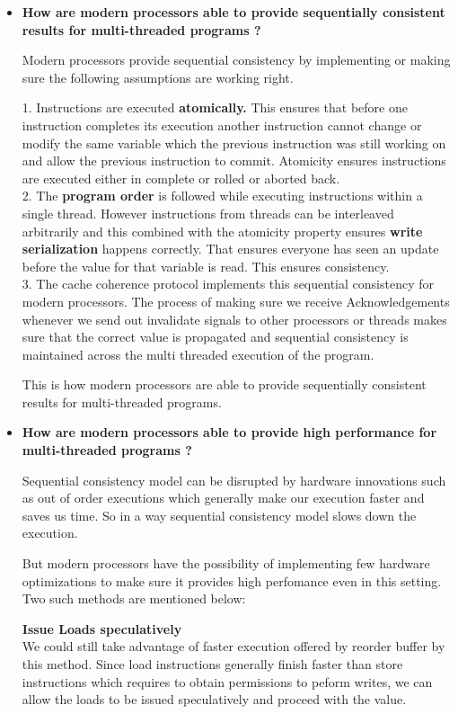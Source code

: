 \documentclass[11pt]{article}
\begin{document}
\begin{itemize}
	\item[] \textbf{How are modern processors able to provide sequentially consistent results for multi-threaded programs ?}
	
	Modern processors provide sequential consistency by implementing or making sure the following assumptions are working right.
	
	1. Instructions are executed \textbf{atomically.} This ensures that before one instruction completes its execution another instruction cannot change or modify the same variable which the previous instruction was still working on and allow the previous instruction to commit. Atomicity ensures instructions are executed either in complete or rolled or aborted back.\\
	
	2. The \textbf{program order} is followed while executing instructions within a single thread. However instructions from threads can be interleaved arbitrarily and this combined with the atomicity property ensures \textbf{write serialization} happens correctly. That ensures  everyone has seen an update before the value for that variable is read. This ensures consistency.\\
	
	3. The cache coherence protocol implements this sequential consistency for modern processors. The process of making sure we receive Acknowledgements whenever we send out invalidate signals to other processors or threads makes sure that the correct value is propagated and sequential consistency is maintained across the multi threaded execution of the program.
	
	This is how modern processors are able to provide sequentially consistent results for multi-threaded programs.
	
	\item[] \textbf{How are modern processors able to provide high performance for multi-threaded programs ?}
	
	Sequential consistency model can be disrupted by hardware innovations such as out of order executions which generally make our execution faster and saves us time. So in a way sequential consistency model slows down the execution.
	
	But modern processors have the possibility of implementing few hardware optimizations to make sure it provides high perfomance even in this setting. Two such methods are mentioned below:
	
	\textbf{Issue Loads speculatively}\\
	 We could still take advantage of faster execution offered by reorder buffer by this method. Since load instructions generally finish faster than store instructions which requires to obtain permissions to peform writes, we can allow the loads to be issued speculatively and proceed with the value.
	 

\end{itemize}
\end{document}
